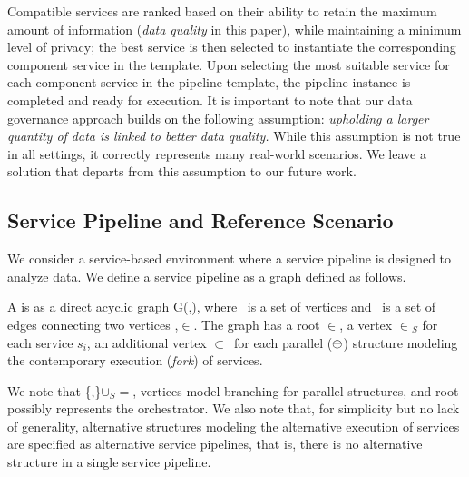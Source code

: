 Compatible services are ranked based on their ability to retain the maximum amount of information (\emph{data quality} in this paper), while maintaining a minimum level of privacy; the best service is then selected to instantiate the corresponding component service in the template.
Upon selecting the most suitable service for each component service in the pipeline template, the pipeline instance is completed and ready for execution.
It is important to note that our data governance approach builds on the following assumption: \emph{upholding a larger quantity of data is linked to better data quality.}
While this assumption is not true in all settings, it correctly represents many real-world scenarios. We leave a solution that departs from this assumption to our future work.

\subsection{Service Pipeline and Reference Scenario}\label{sec:service_definition}
We consider a service-based environment where a service pipeline is designed to analyze data.
We define a service pipeline as a graph defined as follows. %
\begin{definition}[\pipeline]\label{def:pipeline}
  A \pipeline is as a direct acyclic graph G(\V,\E), where \V\ is a set of vertices and \E\ is a set of edges connecting two vertices ,$\in$\V.
  The graph has a root $\in$\V, a vertex $\in$\V$_S$ for each service $s_i$, an additional vertex $\subset$\V\ for each parallel ($\oplus$) structure modeling the contemporary execution (\emph{fork}) of services.
\end{definition}

We note that \{,\}$\cup$\V$_S$$=$\V, vertices  model branching for parallel structures, and root  possibly represents the orchestrator. We also note that, for simplicity but no lack of generality, alternative structures modeling the alternative execution of services are specified as alternative service pipelines, that is, there is no alternative structure in a single service pipeline.


